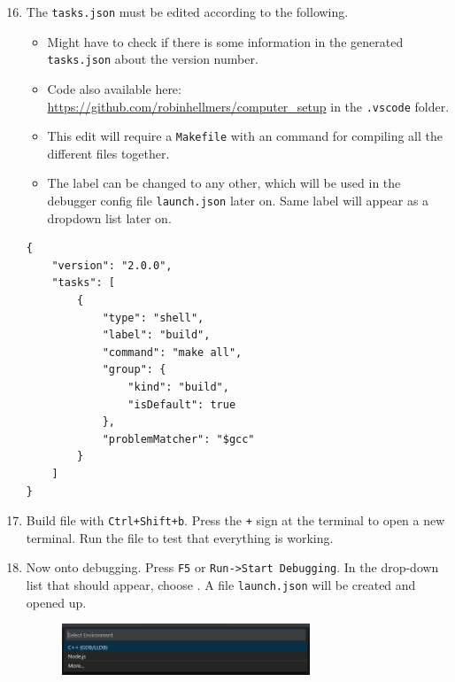 \begin{enumerate}
    \setcounter{enumi}{15}
    
    \item The \texttt{tasks.json} must be edited according to the following.
    
    \begin{itemize}
        \item Might have to check if there is some information in the generated \texttt{tasks.json} about the version number.
        
        \item Code also available here: \url{https://github.com/robinhellmers/computer_setup} in the \texttt{.vscode} folder.
        
        \item This edit will require a \texttt{Makefile} with an  command for compiling all the different files together.
        
        \item The label  can be changed to any other, which will be used in the debugger config file \texttt{launch.json} later on. Same label will appear as a dropdown list later on.
    \end{itemize}
    
\begin{verbatim}
{
    "version": "2.0.0",
    "tasks": [
        {
            "type": "shell",
            "label": "build",
            "command": "make all",
            "group": {
                "kind": "build",
                "isDefault": true
            },
            "problemMatcher": "$gcc"
        }
    ]
}
\end{verbatim}
    
    \item Build file with \texttt{Ctrl+Shift+b}. Press the \texttt{+} sign at the terminal to open a new terminal. Run the file  to test that everything is working.
    
    \item Now onto debugging. Press \texttt{F5} or \texttt{Run->Start Debugging}. In the drop-down list that should appear, choose . A file \texttt{launch.json} will be created and opened up.
    
        \begin{figure}[H]
            \centering
            \includegraphics[width=0.7\textwidth]{Figures/WSL/vscode_environment_c++.PNG}
        \end{figure}
    

\end{enumerate}
